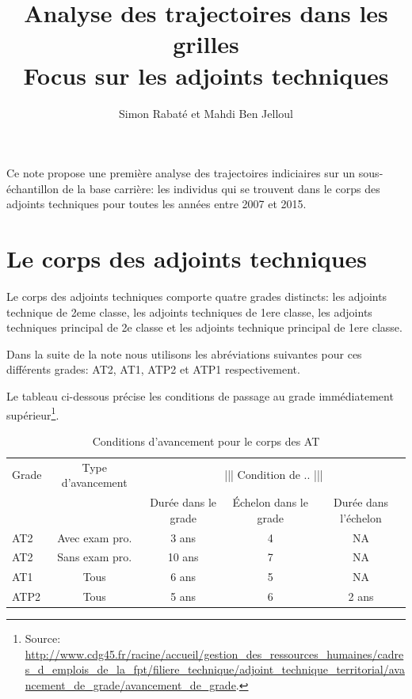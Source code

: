 \documentclass[11pt,a4paper]{article}
\begin{document}
\title{Analyse des trajectoires dans les grilles \\ Focus sur les adjoints techniques}


\author{Simon Rabat\'e et Mahdi Ben Jelloul}


\maketitle

Ce note propose une première analyse des trajectoires indiciaires sur un sous-échantillon de la base carrière: les individus qui se trouvent dans le corps des adjoints techniques pour toutes les années entre 2007 et 2015. 

\renewcommand*\contentsname{\textsc{Plan de la note}}
\tableofcontents

\clearpage


\section{Le corps des adjoints techniques}

Le corps des adjoints techniques comporte quatre grades distincts: les adjoints technique de 2eme classe, les adjoints techniques de 1ere classe, les adjoints techniques principal de 2e classe et les adjoints technique principal de 1ere classe. 

Dans la suite de la note nous utilisons les abréviations suivantes pour ces différents grades: AT2, AT1, ATP2 et ATP1 respectivement. 

Le tableau ci-dessous précise les conditions de passage au grade immédiatement supérieur\footnote{Source: \url{http://www.cdg45.fr/racine/accueil/gestion_des_ressources_humaines/cadres_d_emplois_de_la_fpt/filiere_technique/adjoint_technique_territorial/avancement_de_grade/avancement_de_grade}.}. 



\begin{table}[h!]
\label{means}
\centering
\caption{Conditions d'avancement pour le corps des AT} 
\begin{tabular}{l|c|ccc}
\toprule
 Grade  & Type d'avancement&  \multicolumn{3}{c}{||| Condition de .. |||}  \\
		&  				   &  Durée dans le grade	&  Échelon	dans le grade & Durée dans l'échelon \\
\midrule
AT2  &	Avec exam pro. 	&   3 ans  & 	4  & NA \\
AT2  &	Sans exam pro. 	& 	10 ans &	7  &	NA \\
AT1  & Tous				& 	6 ans  &	5  &	NA \\
ATP2 & Tous				& 	5 ans  &	6  &	2 ans  \\	
%	
\bottomrule
\end{tabular}
\end{table}
\end{document}
